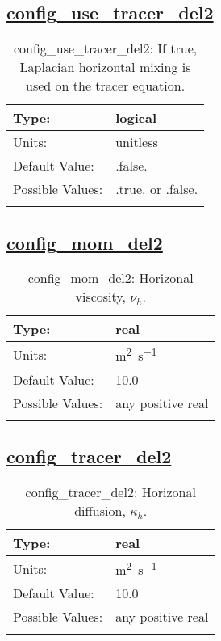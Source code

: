 \subsection[config\_use\_tracer\_del2]{\hyperref[sec:nm_tab_hmix_del2]{config\_use\_tracer\_del2}}
\label{subsec:nm_sec_config_use_tracer_del2}
\begin{center}
\begin{longtable}{| p{2.0in} || p{4.0in} |}
    \hline
    Type: & logical \\
    \hline
    Units: & \si{unitless} \\
    \hline
    Default Value: & .false. \\
    \hline
    Possible Values: & .true. or .false. \\
    \hline
    \caption{config\_use\_tracer\_del2: If true, Laplacian horizontal mixing is used on the tracer equation.}
\end{longtable}
\end{center}
\subsection[config\_mom\_del2]{\hyperref[sec:nm_tab_hmix_del2]{config\_mom\_del2}}
\label{subsec:nm_sec_config_mom_del2}
\begin{center}
\begin{longtable}{| p{2.0in} || p{4.0in} |}
    \hline
    Type: & real \\
    \hline
    Units: & \si{m^2.s^{-1}} \\
    \hline
    Default Value: & 10.0 \\
    \hline
    Possible Values: & any positive real \\
    \hline
    \caption{config\_mom\_del2: Horizonal viscosity, $\nu_h$.}
\end{longtable}
\end{center}
\subsection[config\_tracer\_del2]{\hyperref[sec:nm_tab_hmix_del2]{config\_tracer\_del2}}
\label{subsec:nm_sec_config_tracer_del2}
\begin{center}
\begin{longtable}{| p{2.0in} || p{4.0in} |}
    \hline
    Type: & real \\
    \hline
    Units: & \si{m^2.s^{-1}} \\
    \hline
    Default Value: & 10.0 \\
    \hline
    Possible Values: & any positive real \\
    \hline
    \caption{config\_tracer\_del2: Horizonal diffusion, $\kappa_h$.}
\end{longtable}
\end{center}
